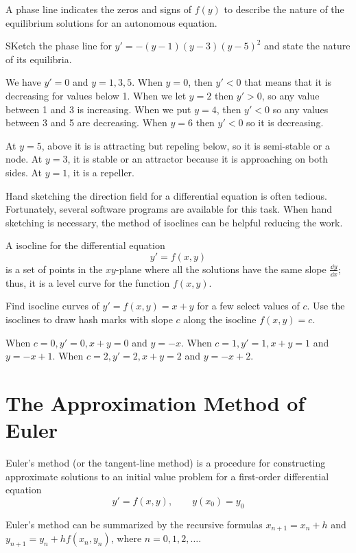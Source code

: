 \documentclass[../diffeq.tex]{subfiles}
\begin{document}
A phase line indicates the zeros and signs of $f(y)$ to describe the nature of the equilibrium solutions for an autonomous equation.

\begin{example}
    SKetch the phase line for $y'=-(y-1)(y-3)(y-5)^2$ and state the nature of its equilibria.

    We have $y'=0$ and $y=1,3,5$. When $y=0$, then $y'<0$ that means that it is decreasing for values below 1. When we let $y=2$ then $y'>0$, so any value between 1 and 3 is increasing. When we put $y=4$, then $y'<0$ so any values between 3 and 5 are decreasing.
    When $y=6$ then $y'<0$ so it is decreasing.

    At $y=5$, above it is is attracting but repeling below, so it is semi-stable or a node. At $y=3$, it is stable or an attractor because it is approaching on both sides. At $y=1$, it is a repeller. 
\end{example}

Hand sketching the direction field for a differential equation is often tedious. Fortunately, several software programs are available for this task. When hand sketching is necessary, the method of isoclines can be helpful reducing the work.

A isocline for the differential equation 
\[ y'=f(x,y) \]
is a set of points in the $xy$-plane where all the solutions have the same slope $\frac{\dd y}{\dd x}$; thus, it is a level curve for the function $f(x,y)$.

\begin{example}
    Find isocline curves of $y'=f(x,y) = x+y$ for a few select values of $c$. Use the isoclines to draw hash marks with slope $c$ along the isocline $f(x,y)=c$.

    When $c=0, y'=0, x+y=0$ and $y=-x$. When $c=1, y'=1,x+y=1$ and $y=-x+1$. When $c=2,y'=2,x+y=2$ and $y=-x+2$.
\end{example}

\section{The Approximation Method of Euler}
Euler's method (or the tangent-line method) is a procedure for constructing approximate solutions to an initial value problem for a first-order differential equation 
\[ y' =f(x,y), \qquad y(x_0)=y_0 \]

Euler's method can be summarized by the recursive formulas $x_{n+1}=x_n+h$ and $y_{n+1}=y_n+hf(x_n,y_n)$, where $n=0,1,2,\dots$.
\end{document}
